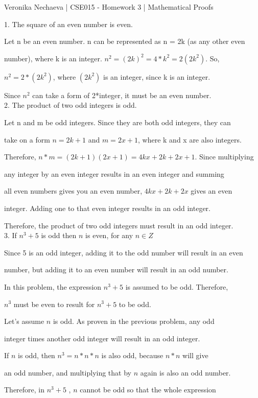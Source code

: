 \documentclass[10pt]{article}
\begin{document}
Veronika Nechaeva | CSE015 - Homework 3 | Mathematical Proofs

1. The square of an even number is even.

Let n be an even number. n can be represented as n = 2k (as any other even 

number), where k is an integer. $n^2=(2k)^2=4*k^2=2(2k^2)$. So, 

$n^2=2*(2k^2)$, where $(2k^2)$ is an integer, since k is an integer. 

Since $n^2$ can take a form of 2*integer, it must be an even number.  \\[\baselineskip]

2. The product of two odd integers is odd.

Let n and m be odd integers. Since they are both odd integers, they can 

take on a form $n=2k+1$ and $m=2x+1$, where k and x are also integers. 

Therefore, $n*m=(2k+1)(2x+1)=4kx+2k+2x+1$. Since multiplying 

any integer by an even integer results in an even integer and summing 

all even numbers gives you an even number, $4kx+2k+2x$ gives an even 

integer. Adding one to that even integer results in an odd integer. 

Therefore, the product of two odd integers must result in an odd integer.  \\[\baselineskip]

3. If $n^3+5$ is odd then $n$ is even, for any $n\in Z$ 

Since 5 is an odd integer, adding it to the odd number will result in an even 

number, but adding it to an even number will result in an odd number. 

In this problem, the expression $n^3+5$ is assumed to be odd. Therefore, 

$n^3$ must be even to result for $n^3+5$ to be odd. 

Let's assume $n$ is odd. As proven in the previous problem, any odd 

integer times another odd integer will result in an odd integer. 

If $n$ is odd, then $n^3=n*n*n$ is also odd, because $n*n$ will give 

an odd number, and multiplying that by $n$ again is also an odd number. 

Therefore, in $n^3+5$ , $n$ cannot be odd so that the whole expression 
\end{document}
